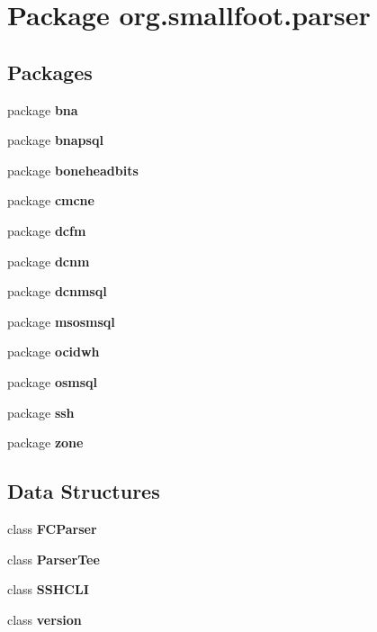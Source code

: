 \section{Package org.\+smallfoot.\+parser}
\label{namespaceorg_1_1smallfoot_1_1parser}
\subsection*{Packages}
\begin{DoxyCompactItemize}
\item 
package {\bf bna}
\item 
package {\bf bnapsql}
\item 
package {\bf boneheadbits}
\item 
package {\bf cmcne}
\item 
package {\bf dcfm}
\item 
package {\bf dcnm}
\item 
package {\bf dcnmsql}
\item 
package {\bf msosmsql}
\item 
package {\bf ocidwh}
\item 
package {\bf osmsql}
\item 
package {\bf ssh}
\item 
package {\bf zone}
\end{DoxyCompactItemize}
\subsection*{Data Structures}
\begin{DoxyCompactItemize}
\item 
class {\bf F\+C\+Parser}
\item 
class {\bf Parser\+Tee}
\item 
class {\bf S\+S\+H\+C\+L\+I}
\item 
class {\bf version}
\end{DoxyCompactItemize}
